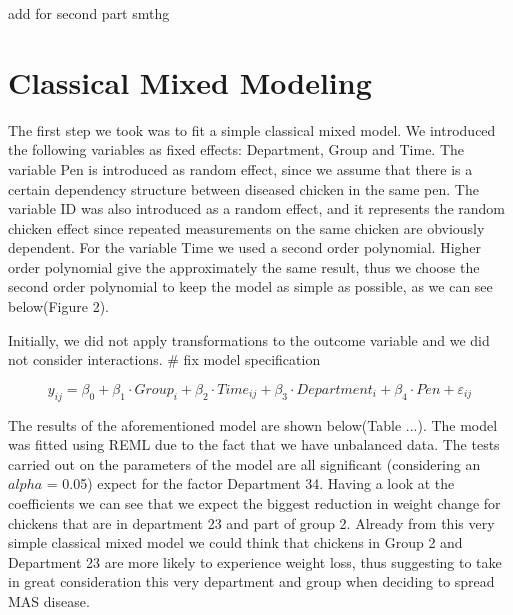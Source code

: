 \documentclass{article}
\begin{document}
add for second part smthg 

\section{Classical Mixed Modeling}

The first step we took was to fit a simple classical mixed model. We introduced the following variables as fixed effects: Department, Group and Time. The variable Pen is introduced as random effect, since we assume that there is a certain dependency structure between diseased chicken in the same pen. The variable ID was also introduced as a random effect, and it represents the random chicken effect since repeated measurements on the same chicken are obviously dependent. 
For the variable Time we used a second order polynomial. Higher order polynomial give the approximately the same result, thus we choose the second order polynomial to keep the model as simple as possible, as we can see below(Figure 2).



Initially, we did not apply transformations to the outcome variable and we did not consider interactions. # fix model specification 

\begin{equation}
    y_{ij} =  \beta_0  + \beta_1 \cdot Group_i + \beta_2 \cdot Time_{ij} + \beta_3 \cdot Department_{i} + \beta_4 \cdot Pen  + \varepsilon_{ij}
\end{equation}




The results of the aforementioned model are shown below(Table ...). The model was fitted using REML due to the fact that we have unbalanced data. The tests carried out on the parameters of the model are all significant (considering an $alpha$ = 0.05) expect for the factor Department 34. Having a look at the coefficients we can see that we expect the biggest reduction in weight change for chickens that are in department 23 and part of group 2. Already from this very simple classical mixed model we could think that chickens in Group 2 and Department 23 are more likely to experience weight loss, thus suggesting to take in great consideration this very department and group when deciding to spread MAS disease. 
\end{document}
